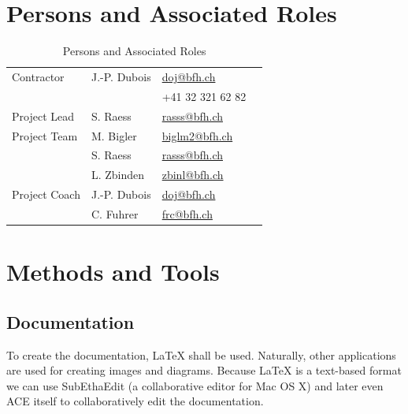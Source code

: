 \documentclass[11pt,a4paper]{article}
\begin{document}
\appendix

\section{Persons and Associated Roles}

\begin{table}[H]
 \begin{center}
 \begin{tabular}{|l|l|l|l|}
 \hline
 Contractor             &  J.-P. Dubois     & \href{mailto:doj@bfh.ch}{doj@bfh.ch} \\
                        &                   &  +41 32 321 62 82 \\
 \hline
 Project Lead           &  S. Raess         & \href{mailto:rasss@bfh.ch}{rasss@bfh.ch} \\
 \hline
 Project Team           &  M. Bigler        & \href{mailto:biglm2@bfh.ch}{biglm2@bfh.ch} \\ 
                        &  S. Raess         & \href{mailto:rasss@bfh.ch}{rasss@bfh.ch} \\
                        &  L. Zbinden       & \href{mailto:zbinl@bfh.ch}{zbinl@bfh.ch} \\
 \hline
 Project Coach          &  J.-P. Dubois     & \href{mailto:doj@bfh.ch}{doj@bfh.ch} \\
                        &  C. Fuhrer        & \href{frc@bfh.ch}{frc@bfh.ch} \\
 \hline
 \end{tabular}
 \end{center}
 \caption{Persons and Associated Roles}
 \label{table: Persons and Associated Roles}
\end{table}


\section{Methods and Tools}

\subsection{Documentation}
To create the documentation, \LaTeX{} shall be used. Naturally, other 
applications are used for creating images and diagrams. Because \LaTeX{} is a 
text-based format we can use SubEthaEdit (a collaborative editor for Mac OS X) 
and later even ACE itself to collaboratively edit the documentation. 
\end{document}
